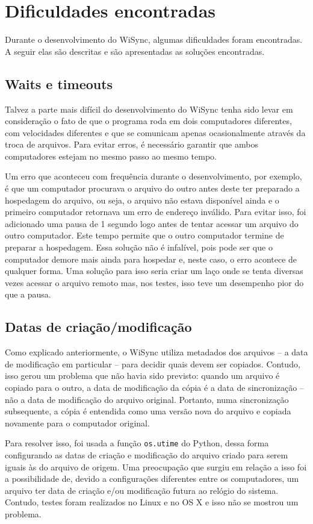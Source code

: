 \documentclass[12pt,a4paper]{ufpr}
\begin{document}
\section{Dificuldades encontradas}
Durante o desenvolvimento do WiSync, algumas dificuldades foram encontradas.
A seguir elas são descritas e são apresentadas as soluções encontradas.

\subsection{Waits e timeouts}
Talvez a parte mais difícil do desenvolvimento do WiSync tenha sido levar em consideração o fato de que o programa roda em dois computadores diferentes, com velocidades diferentes e que se comunicam apenas ocasionalmente através da troca de arquivos.
Para evitar erros, é necessário garantir que ambos computadores estejam no mesmo passo ao mesmo tempo.

Um erro que aconteceu com frequência durante o desenvolvimento, por exemplo, é que um computador procurava o arquivo do outro antes deste ter preparado a hospedagem do arquivo, ou seja, o arquivo não estava disponível ainda e o primeiro computador retornava um erro de endereço inválido.
Para evitar isso, foi adicionado uma pausa de 1 segundo logo antes de tentar acessar um arquivo do outro computador.
Este tempo permite que o outro computador termine de preparar a hospedagem.
Essa solução não é infalível, pois pode ser que o computador demore mais ainda para hospedar e, neste caso, o erro acontece de qualquer forma.
Uma solução para isso seria criar um laço onde se tenta diversas vezes acessar o arquivo remoto mas, nos testes, isso teve um desempenho pior do que a pausa.

\subsection{Datas de criação/modificação}
Como explicado anteriormente, o WiSync utiliza metadados dos arquivos \--- a data de modificação em particular \--- para decidir quais devem ser copiados.
Contudo, isso gerou um problema que não havia sido previsto: quando um arquivo é copiado para o outro, a data de modificação da cópia é a data de sincronização \--- não a data de modificação do arquivo original.
Portanto, numa sincronização subsequente, a cópia é entendida como uma versão nova do arquivo e copiada novamente para o computador original.

Para resolver isso, foi usada a função \texttt{os.utime} do Python, dessa forma configurando as datas de criação e modificação do arquivo criado para serem iguais às do arquivo de origem. Uma preocupação que surgiu em relação a isso foi a possibilidade de, devido a configurações diferentes entre os computadores, um arquivo ter data de criação e/ou modificação futura ao relógio do sistema.
Contudo, testes foram realizados no Linux e no OS X e isso não se mostrou um problema.
\end{document}
